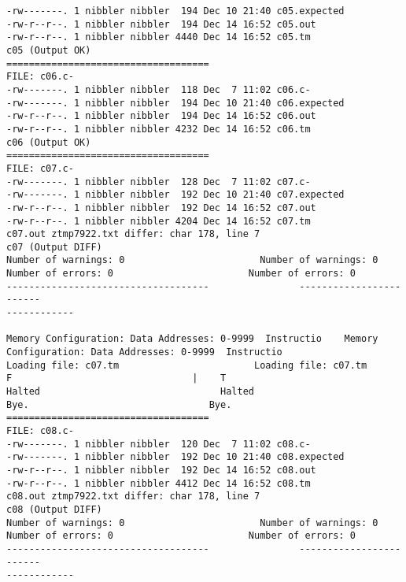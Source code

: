\documentclass[12pt]{book}
\begin{document}
\begin{lstlisting}
-rw-------. 1 nibbler nibbler  194 Dec 10 21:40 c05.expected
-rw-r--r--. 1 nibbler nibbler  194 Dec 14 16:52 c05.out
-rw-r--r--. 1 nibbler nibbler 4440 Dec 14 16:52 c05.tm
c05 (Output OK)
====================================
FILE: c06.c-
-rw-------. 1 nibbler nibbler  118 Dec  7 11:02 c06.c-
-rw-------. 1 nibbler nibbler  194 Dec 10 21:40 c06.expected
-rw-r--r--. 1 nibbler nibbler  194 Dec 14 16:52 c06.out
-rw-r--r--. 1 nibbler nibbler 4232 Dec 14 16:52 c06.tm
c06 (Output OK)
====================================
FILE: c07.c-
-rw-------. 1 nibbler nibbler  128 Dec  7 11:02 c07.c-
-rw-------. 1 nibbler nibbler  192 Dec 10 21:40 c07.expected
-rw-r--r--. 1 nibbler nibbler  192 Dec 14 16:52 c07.out
-rw-r--r--. 1 nibbler nibbler 4204 Dec 14 16:52 c07.tm
c07.out ztmp7922.txt differ: char 178, line 7
c07 (Output DIFF)
Number of warnings: 0                        Number of warnings: 0
Number of errors: 0                        Number of errors: 0
------------------------------------                ------------------------
------------

Memory Configuration: Data Addresses: 0-9999  Instructio    Memory 
Configuration: Data Addresses: 0-9999  Instructio
Loading file: c07.tm                        Loading file: c07.tm
F                                |    T 
Halted                                Halted
Bye.                                Bye.
====================================
FILE: c08.c-
-rw-------. 1 nibbler nibbler  120 Dec  7 11:02 c08.c-
-rw-------. 1 nibbler nibbler  192 Dec 10 21:40 c08.expected
-rw-r--r--. 1 nibbler nibbler  192 Dec 14 16:52 c08.out
-rw-r--r--. 1 nibbler nibbler 4412 Dec 14 16:52 c08.tm
c08.out ztmp7922.txt differ: char 178, line 7
c08 (Output DIFF)
Number of warnings: 0                        Number of warnings: 0
Number of errors: 0                        Number of errors: 0
------------------------------------                ------------------------
------------


\end{lstlisting}
\end{document}
